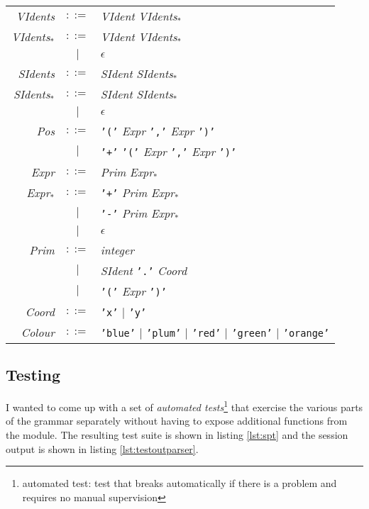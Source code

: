 \documentclass[
paper=a4,
oneside,
fontsize=11pt,
numbers=noenddot,
headinclude=false, %
footinclude=false, %
fleqn,             %
DIV=8
]{scrartcl}
\begin{document}
\begin{table}[h]
\begin{tabularx}{\textwidth}{rcX}
    {\em VIdents}    & $::=$ & {\em VIdent} {\em VIdents$_{*}$}\\
    {\em VIdents$_{*}$}    & $::=$ & {\em VIdent} {\em VIdents$_{*}$}\\
               & $|$   & $\epsilon$\\
    {\em SIdents}    & $::=$ & {\em SIdent} {\em SIdents$_{*}$}\\
    {\em SIdents$_{*}$}    & $::=$ & {\em SIdent} {\em SIdents$_{*}$}\\
               & $|$   & $\epsilon$\\
    {\em Pos}        & $::=$ & {\tt '('} {\em Expr} {\tt ','} {\em Expr} {\tt ')'}\\
               & $|$   & {\tt '+'} {\tt '('} {\em Expr} {\tt ','} {\em Expr} {\tt ')'}\\
    {\em Expr}       & $::=$ & {\em Prim} {\em Expr$_{*}$}\\
    {\em Expr$_{*}$}       & $::=$ & {\tt '+'} {\em Prim} {\em Expr$_{*}$}\\
               & $|$   & {\tt '-'} {\em Prim} {\em Expr$_{*}$}\\
               & $|$   & $\epsilon$\\
    {\em Prim}       & $::=$ & {\em integer}\\
               & $|$   & {\em SIdent} {\tt '.'} {\em Coord}\\
               & $|$   & {\tt '('} {\em Expr} {\tt ')'}\\
    {\em Coord}       & $::=$ & {\tt 'x'} $|$ {\tt 'y'}\\
    {\em Colour}     & $::=$ & {\tt 'blue'} $|$ {\tt 'plum'} $|$ {\tt 'red'} $|$ {\tt 'green'} $|$ {\tt 'orange'}\\
    \bottomrule
  \end{tabularx}
\end{table}

\subsection{Testing}
\label{sec:testing}

I wanted to come up with a set of {\em automated tests}\footnote{automated test:
  test that breaks automatically if there is a problem and requires no manual
  supervision} that exercise the various parts of the grammar separately without
having to expose additional functions from the module. The resulting test suite
is shown in listing \ref{lst:spt} and the session output is shown in listing
\ref{lst:testoutparser}.
\end{document}
